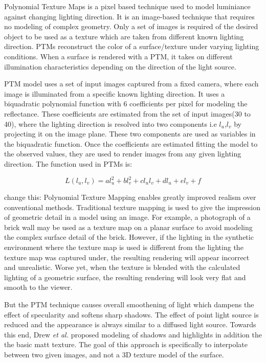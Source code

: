 Polynomial Texture Maps is a pixel based technique used to model luminiance
against changing lighting direction. 
It is an image-based technique that requires
no modeling of complex geometry. Only a set of images is required of the desired object to be used as a
texture which are taken from different known lighting
direction. 
PTMs reconstruct the color of a surface/texture under varying lighting
conditions. When a surface is rendered with a PTM, it takes on different illumination
characteristics depending on the direction of the light source.


PTM model uses a set of input images captured from a fixed camera, where each
image is illuminated from a specific known lighting direction. It uses a
biquadratic polynomial function with 6 coefficients per pixel for modeling the
reflectance. These coefficients are estimated from the set of input images(30 to
40), where the lighting direction is resolved into two components i.e
$l_{u}$,$l_{v}$ by projecting it on the image plane. These two components are
used as variables in the biquadratic function. Once the coefficients are
estimated fitting the model to the observed values, they are used to render
images from any given lighting direction.
The function used in PTMs is:

\begin{equation}
L(l_u,l_v) = al_u^2 + bl_v^2 + cl_ul_v + dl_u + el_v +f
\end{equation}

change this:
Polynomial Texture Mapping enables greatly improved realism
over conventional methods. Traditional texture mapping is used to
give the impression of geometric detail in a model using an image.
For example, a photograph of a brick wall may be used as a
texture map on a planar surface to avoid modeling the complex
surface detail of the brick. However, if the lighting in the
synthetic environment where the texture map is used is different
from the lighting the texture map was captured under, the
resulting rendering will appear incorrect and unrealistic. Worse
yet, when the texture is blended with the calculated lighting of a
geometric surface, the resulting rendering will look very flat and
smooth to the viewer.


But the PTM technique causes overall smoothening of light which dampens the effect
of specularity and softens sharp shadows. The effect of point light source is
reduced and the appearance is always similar to a diffused light source. Towards
this end, Drew {\em et al.} \cite{chap2-9} proposed modeling of shadows and
highlights in addition the the basic matt texture. The goal of this approach is
specifically to interpolate between two given images, and not a 3D texture model
of the surface.

